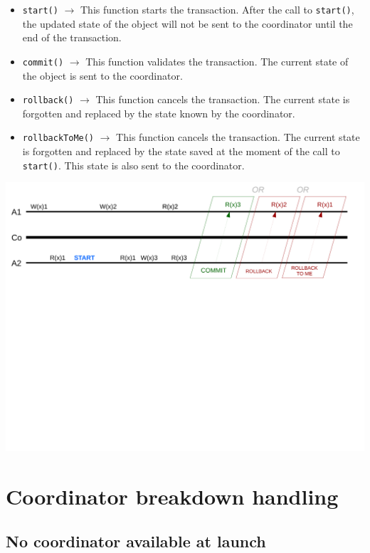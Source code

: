 \documentclass{article}
\begin{document}
\begin{itemize}
\item \texttt{start()} $\rightarrow$ This function starts the transaction. After the call to \texttt{start()}, the updated state of the object will not be sent to the coordinator until the end of the transaction. 
\item \texttt{commit()} $\rightarrow$ This function validates the transaction. The current state of the object is sent to the coordinator.
\item \texttt{rollback()} $\rightarrow$ This function cancels the transaction. The current state is forgotten and replaced by the state known by the coordinator.
\item \texttt{rollbackToMe()} $\rightarrow$ This function cancels the transaction. The current state is forgotten and replaced by the state saved at the moment of the call to \texttt{start()}. This state is also sent to the coordinator.
\end{itemize}

\begin{center}
\includegraphics[width=16.85cm, clip, trim=0.4cm 13.2cm 0.6cm 0.2cm]{sch2}
\end{center}

\section{Coordinator breakdown handling}

\subsection{No coordinator available at launch}
\end{document}
